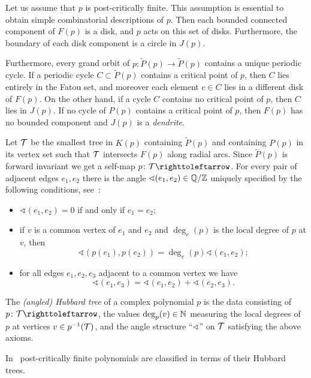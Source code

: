 \documentclass{amsart}
\begin{document}
Let us assume that $p$ is post-critically finite. This assumption is
essential to obtain simple combinatorial descriptions of $p$. Then each
bounded connected component of $F(p)$ is a disk, and $p$ acts on this set
of disks. Furthermore, the boundary of each disk component is a circle in
$J(p)$.

Furthermore, every grand orbit of $p\colon \widetilde P(p)\to\widetilde
P(p)$ contains a unique periodic cycle. If a periodic cycle $C\subset
\widetilde P(p)$ contains a critical point of $p$, then $C$ lies entirely
in the Fatou set, and moreover each element $c\in C$ lies in a different
disk of $F(p)$. On the other hand, if a cycle $C$ contains no critical
point of $p$, then $C$ lies in $J(p)$. If no cycle of $P(p)$ contains a
critical point of $p$, then $F(p)$ has no bounded component and $J(p)$ is a
\emph{dendrite}.

Let ${\mathcal T}$ be the smallest tree in $K(p)$ containing $\widetilde P(p)$ and
containing $P(p)$ in its vertex set such that ${\mathcal T}$ intersects $F(p)$ along
radial arcs. Since $\widetilde P(p)$ is forward invariant we get a self-map
$p\colon\HT\righttoleftarrow$. For every pair of adjacent edges $e_1, e_2$
there is the angle $\sphericalangle(e_1,e_2)\in {\mathbb Q}/{\mathbb Z}$ uniquely specified
by the following conditions, see~\cite{poirier:trees}:
\begin{itemize}
\item $\sphericalangle(e_1,e_2)=0$ if and only if $e_1=e_2$; 
\item if $v$ is a common vertex of $e_1$ and $e_2$ and $\deg_v(p)$ is the
  local degree of $p$ at $v$, then
  \[\sphericalangle(p(e_1),p(e_2))=\deg_v(p)\sphericalangle(e_1,e_2);\]
\item for all edges $e_1, e_2,e_3$ adjacent to a common vertex we have
  \[\sphericalangle(e_1,e_3)=\sphericalangle(e_1,e_2)+\sphericalangle(e_2,e_3).\] 
\end{itemize}

\begin{defn}
  The \emph{(angled) Hubbard tree} of a complex polynomial $p$ is the data
  consisting of $p\colon\HT\righttoleftarrow$, the values $\deg_p(v)\in {\mathbb N}$
  measuring the local degrees of $p$ at vertices $v\in p^{-1}({\mathcal T})$, and the angle
  structure ``$\sphericalangle$'' on ${\mathcal T}$ satisfying the above axioms.
\end{defn}

In~\cite{poirier:trees} post-critically finite polynomials are classified
in terms of their Hubbard trees.
\end{document}
